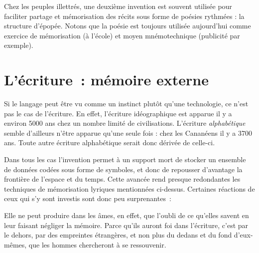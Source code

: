 Chez les peuples illettrés, une deuxième invention est souvent utilisée pour faciliter partage et mémorisation des récits sous forme de poésies rythmées : la structure d'épopée\cite{havelock-preface-plato}. Notons que la poésie est toujours utilisée aujourd'hui comme exercice de mémorisation (à l'école) et moyen mnémotechnique (publicité par exemple).

\chapter{L'écriture~: mémoire externe}
Si le langage peut être vu comme un instinct plutôt qu'une technologie, ce n'est pas le cas de l'écriture. En effet, l'écriture idéographique est apparue il y a environ 5000 ans chez un nombre limité de civilisations. L'écriture \emph{alphabétique} semble d'ailleurs n'être apparue qu'une seule fois : chez les Cananéens il y a 3700 ans\cite{linguistics-pinker}. Toute autre écriture alphabétique serait donc dérivée de celle-ci.

Dans tous les cas l'invention permet à un support mort de stocker un ensemble de données codées sous forme de symboles, et donc de repousser d'avantage la frontière de l'espace et du temps. Cette avancée rend presque redondantes les techniques de mémorisation lyriques mentionnées ci-dessus. Certaines réactions de ceux qui s'y sont investis sont donc peu surprenantes~:

\begin{coolquote}
Elle ne peut produire dans les âmes, en effet, que l'oubli de ce qu'elles  savent en leur faisant négliger la mémoire. Parce qu'ils auront foi dans  l'écriture, c'est par le dehors, par des empreintes étrangères, et non plus du dedans et du fond d'eux-mêmes, que les hommes chercheront à se ressouvenir. 
\end{coolquote}


